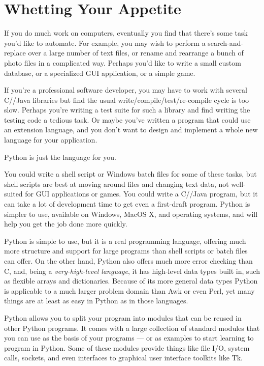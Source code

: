 \documentclass{manual}
\begin{document}
\tableofcontents


\chapter{Whetting Your Appetite \label{intro}}

If you do much work on computers, eventually you find that there's
some task you'd like to automate.  For example, you may wish to
perform a search-and-replace over a large number of text files, or
rename and rearrange a bunch of photo files in a complicated way.
Perhaps you'd like to write a small custom database, or a specialized
GUI application, or a simple game.

If you're a professional software developer, you may have to work with
several C/\Cpp/Java libraries but find the usual
write/compile/test/re-compile cycle is too slow.  Perhaps you're
writing a test suite for such a library and find writing the testing
code a tedious task.  Or maybe you've written a program that could use
an extension language, and you don't want to design and implement a
whole new language for your application.

Python is just the language for you.

You could write a {\UNIX} shell script or Windows batch files for some
of these tasks, but shell scripts are best at moving around files and
changing text data, not well-suited for GUI applications or games.
You could write a C/{\Cpp}/Java program, but it can take a lot of
development time to get even a first-draft program.  Python is simpler
to use, available on Windows, MacOS X, and {\UNIX} operating systems,
and will help you get the job done more quickly.

Python is simple to use, but it is a real programming language,
offering much more structure and support for large programs than shell
scripts or batch files can offer.  On the other hand, Python also
offers much more error checking than C, and, being a
\emph{very-high-level language}, it has high-level data types built
in, such as flexible arrays and dictionaries.  Because of its more
general data types Python is applicable to a much larger problem
domain than Awk or even Perl, yet many things are at
least as easy in Python as in those languages.

Python allows you to split your program into modules that can be
reused in other Python programs.  It comes with a large collection of
standard modules that you can use as the basis of your programs --- or
as examples to start learning to program in Python.  Some of these
modules provide things like file I/O, system calls,
sockets, and even interfaces to graphical user interface toolkits like Tk.  
\end{document}
